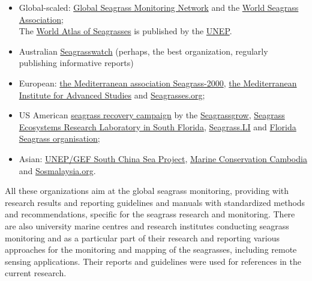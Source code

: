 \documentclass[11pt]{article}
\begin{document}
\begin{itemize}
	\item Global-scaled: \href{http://www.seagrassnet.org/}{Global Seagrass Monitoring Network} and the \href{http://wsa.seagrassonline.org/}{World Seagrass Association}; \\ The \href{http://www.unep-wcmc.org/marine/seagrassatlas/contents.htm}{World Atlas of Seagrasses} is published by the \href{http://www.unep.org/}{UNEP}.
	\item Australian \href{http://www.seagrasswatch.org/}{Seagrasswatch} (perhaps, the best organization, regularly publishing informative reports)
	\item European: \href{http://mediterranean.seagrassonline.org/}{the Mediterranean association Seagrass-2000}, \href{http://www.imedea.uib.es/index.php}{the Mediterranean Institute for Advanced Studies} and \href{http://www.seagrasses.org/}{Seagrasses.org};
	\item  US American \href{http://www.columbia.com/Seagrass-Recovery/About_Us_Giving_Back_Seagrass,default,pg.html}{seagrass recovery campaign} by the \href{http://www.seagrassgrow.org/}{Seagrassgrow}, \href{http://www2.fiu.edu/~seagrass/}{Seagrass Ecosystems Research Laboratory in South Florida}, \href{http://counties.cce.cornell.edu/suffolk/habitat_restoration/seagrassli/index.html}{Seagrass.LI} and
\href{http://www.flseagrass.org/}{Florida Seagrass organisation}; 
	\item Asian: \href{http://www.unepscs.org/}{UNEP/GEF South China Sea Project}, \href{http://www.marineconservationcambodia.org/Marine-Species-Photographic-Database/Cambodian-Marine-Life/Cambodian-Marine-Plants/Seagrasses.html}{Marine Conservation Cambodia} and \href{http://www.sosmalaysia.org/home.html}{Sosmalaysia.org}.
\end{itemize}
All these organizations aim at the global seagrass monitoring, providing with
research results and reporting guidelines and manuals with standardized methods and
recommendations, specific for the seagrass research and monitoring. There are also university marine
centres and research institutes conducting seagrass monitoring and as a particular part of their
research and reporting various approaches for the monitoring and mapping of the seagrasses, including remote
sensing applications. Their reports and guidelines were used for references in the current research. 
\end{document}
